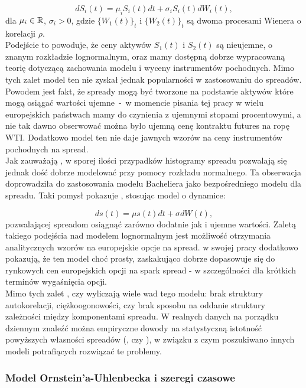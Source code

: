 $$ dS_i(t) = \mu_i S_i(t)dt + \sigma_i S_i(t)dW_i(t),$$
dla $\mu_i \in \mathbb{R}$, $\sigma_i >0$, gdzie $\{W_1(t)\}_t$ i $\{W_2(t)\}_t$ są dwoma procesami Wienera o korelacji $\rho$.\\

Podejście to powoduje, że ceny aktywów $S_1(t)$ i $S_2(t)$ są nieujemne, o znanym rozkładzie lognormalnym, oraz mamy dostępną dobrze wypracowaną teorię dotyczącą zachowania modelu i wyceny instrumentów pochodnych. Mimo tych zalet model ten nie zyskał jednak popularności w zastosowaniu do spreadów. Powodem jest fakt, że spready mogą być tworzone na podstawie aktywów które mogą osiągać wartości ujemne~-~w momencie pisania tej pracy w wielu europejskich państwach mamy do czynienia z ujemnymi stopami procentowymi, a nie tak dawno obserwować można było ujemną cenę kontraktu futures na ropę WTI. Dodatkowo model ten nie daje jawnych wzorów na ceny instrumentów pochodnych na spread. \\
Jak zauważają \cite{Carmona_Spread_Options}, w sporej ilości przypadków histogramy spreadu pozwalają się jednak dość dobrze modelować przy pomocy rozkładu normalnego. Ta obserwacja doprowadziła do zastosowania modelu Bacheliera jako bezpośredniego modelu dla spreadu. Taki pomysł pokazuje \cite{Poitras_Spread_Options_Arithmetic}, stosując model o dynamice:

$$ ds(t) = \mu s(t) dt + \sigma dW(t),$$
pozwalającej spreadom osiągnąć zarówno dodatnie jak i ujemne wartości. Zaletą takiego podejścia nad modelem lognormalnym jest możliwość otrzymania analitycznych wzorów na europejskie opcje na spread. \cite{Carmona_Spread_Options} w swojej pracy dodatkowo pokazują, że ten model choć prosty, zaskakująco dobrze  dopasowuje się do rynkowych cen europejskich opcji na spark spread - w szczególności dla krótkich terminów wygaśnięcia opcji.\\
Mimo tych zalet \cite{Herath_Copula_Crack_Spread}, czy \cite{Kim_NonNormal_Spread} wyliczają wiele wad tego modelu: brak struktury autokorelacji, ciężkoogonowości, czy brak sposobu na oddanie struktury zależności między komponentami spreadu. W realnych danych na porządku dziennym znaleźć można empiryczne dowody na statystyczną istotność powyższych własności spreadów (\cite{Kim_NonNormal_Spread}, czy \cite{Schwartz_Ornstein}), w związku z czym poszukiwano innych modeli potrafiących rozwiązać te problemy.

\subsubsection{Model Ornstein'a-Uhlenbecka i szeregi czasowe}

